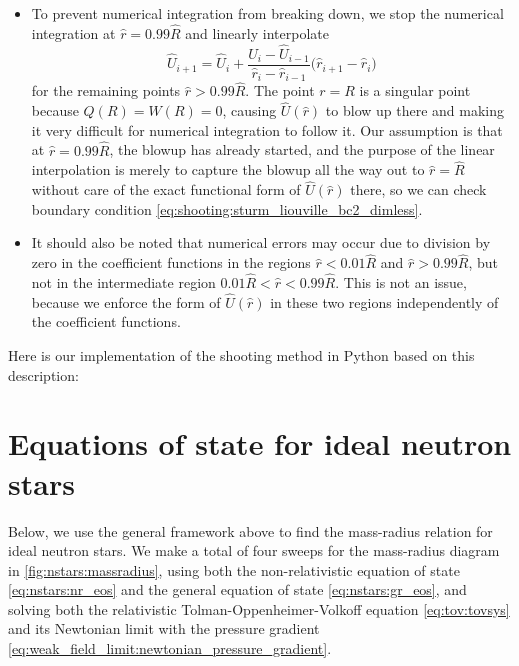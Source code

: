 \begin{itemize}
\begin{subequations}
      \end{subequations}
\item To prevent numerical integration from breaking down, we stop the numerical integration at $\hat{r} = 0.99 \hat{R}$ and linearly interpolate
      \begin{equation}
          \hat{U}_{i+1} = \hat{U}_i + \frac{\hat{U}_i - \hat{U}_{i-1}}{\hat{r}_i - \hat{r}_{i-1}} \Big( \hat{r}_{i+1} - \hat{r}_i \Big)
      \end{equation}
      for the remaining points $\hat{r} > 0.99 \hat{R}$.
      The point $r=R$ is a singular point because $Q(R) = W(R) = 0$, causing $\hat{U}(\hat{r})$ to blow up there and making it very difficult for numerical integration to follow it.
      Our assumption is that at $\hat{r} = 0.99 \hat{R}$, the blowup has already started, and the purpose of the linear interpolation is merely to capture the blowup all the way out to $\hat{r}=\hat{R}$ without care of the exact functional form of $\hat{U}(\hat{r})$ there, so we can check boundary condition \eqref{eq:shooting:sturm_liouville_bc2_dimless}.
\item It should also be noted that numerical errors may occur due to division by zero in the coefficient functions in the regions $\hat{r} < 0.01 \hat{R}$ and $\hat{r} > 0.99 \hat{R}$, but not in the intermediate region $0.01 \hat{R} < \hat{r} < 0.99 \hat{R}$.
      This is not an issue, because we enforce the form of $\hat{U}(\hat{r})$ in these two regions independently of the coefficient functions.
\end{itemize}

Here is our implementation of the shooting method in Python based on this description:


\section{Equations of state for ideal neutron stars}
\label{sec:num:nstars}

Below, we use the general framework above to find the mass-radius relation for ideal neutron stars.
We make a total of four sweeps for the mass-radius diagram in \cref{fig:nstars:massradius}, using both the non-relativistic equation of state \eqref{eq:nstars:nr_eos} and the general equation of state \eqref{eq:nstars:gr_eos}, and solving both the relativistic Tolman-Oppenheimer-Volkoff equation \eqref{eq:tov:tovsys} and its Newtonian limit with the pressure gradient \eqref{eq:weak_field_limit:newtonian_pressure_gradient}.

